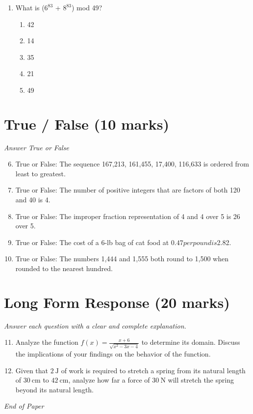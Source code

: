 \documentclass[12pt]{article}
\begin{document}
\begin{enumerate}[label=\arabic*.]
\begin{enumerate}[label=(\alph*)]
    \item -2.0
    \item 3.0
    \item 2.0
    \item 1.5
\end{enumerate}
\item What is ($6^83$ + $8^83$) mod 49?
\begin{enumerate}[label=(\alph*)]
    \item 42
    \item 14
    \item 35
    \item 21
    \item 49
\end{enumerate}
\end{enumerate}

\section*{True / False (10 marks)}
\textit{Answer True or False}
\begin{enumerate}[label=\arabic*.]
\setcounter{enumi}{5}
\item True or False: The sequence 167,213, 161,455, 17,400, 116,633 is ordered from least to greatest.
\item True or False: The number of positive integers that are factors of both 120 and 40 is 4.
\item True or False: The improper fraction representation of 4 and 4 over 5 is 26 over 5.
\item True or False: The cost of a 6-lb bag of cat food at $0.47 per pound is $2.82.
\item True or False: The numbers 1,444 and 1,555 both round to 1,500 when rounded to the nearest hundred.
\end{enumerate}

\section*{Long Form Response (20 marks)}
\textit{Answer each question with a clear and complete explanation.}
\begin{enumerate}[label=\arabic*.]
\setcounter{enumi}{10}
\item Analyze the function \( f(x) = \frac{x+6}{\sqrt{x^2-3 x-4} } \) to determine its domain. Discuss the implications of your findings on the behavior of the function.
\item Given that $2 \mathrm{~J}$ of work is required to stretch a spring from its natural length of $30 \mathrm{~cm}$ to $42 \mathrm{~cm}$, analyze how far a force of $30 \mathrm{~N}$ will stretch the spring beyond its natural length.
\end{enumerate}

\vfill
\noindent\textit{End of Paper}
\end{document}

